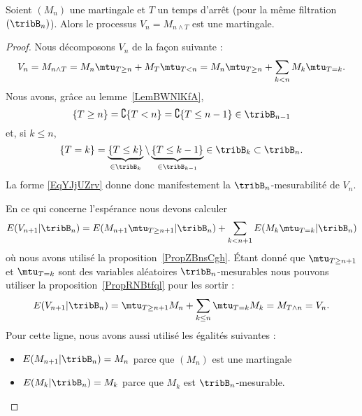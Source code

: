 \begin{proposition} \label{PropAYJpGsc}
    Soient \( (M_n)\) une martingale et \( T\) un temps d'arrêt (pour la même filtration \( (\tribB_n)\)). Alors le processus \( V_n=M_{n\wedge T}\) est une martingale.
\end{proposition}

\begin{proof}
    Nous décomposons \( V_n\) de la façon suivante :
    \begin{equation}    \label{EqYJjUZrv}
        V_n=M_{n\wedge T}=M_n\mtu_{T\geq n}+M_T\mtu_{T<n}=M_n\mtu_{T\geq n}+\sum_{k< n}M_k\mtu_{T=k}.
    \end{equation}
    Nous avons, grâce au lemme~\ref{LemBWNlKfA},
    \begin{equation}
        \{ T\geq n \}=\complement\{ T<n \}=\complement\{ T\leq n-1 \}\in\tribB_{n-1}
    \end{equation}
    et, si \( k\leq n\),
    \begin{equation}
        \{ T=k \}=\underbrace{\{ T\leq k \}}_{\in\tribB_k}\setminus\underbrace{\{ T\leq k-1 \}}_{\in\tribB_{k-1}}\in\tribB_k\subset\tribB_n.
    \end{equation}
    La forme \eqref{EqYJjUZrv} donne donc manifestement la \( \tribB_n\)-mesurabilité de \( V_n\).

    En ce qui concerne l'espérance nous devons calculer
    \begin{equation}
        E(V_{n+1}|\tribB_n)=E(M_{n+1}\mtu_{T\geq n+1}|\tribB_n)+\sum_{k<n+1}E(M_k\mtu_{T=k}|\tribB_n)
    \end{equation}
    où nous avons utilisé la proposition~\ref{PropZBnsCgh}. Étant donné que \( \mtu_{T\geq n+1}\) et \( \mtu_{T=k}\) sont des variables aléatoires \( \tribB_n\)-mesurables nous pouvons utiliser la proposition~\ref{PropRNBtfql} pour les sortir :
    \begin{equation}
        E(V_{n+1}|\tribB_n)=\mtu_{T\geq n+1}M_n+\sum_{k\leq n}\mtu_{T=k}M_k=M_{T\wedge n}=V_n.
    \end{equation}
    Pour cette ligne, nous avons aussi utilisé les égalités suivantes :
    \begin{itemize}
        \item 
     \( E(M_{n+1}|\tribB_n)=M_n\) parce que \( (M_n)\) est une martingale
 \item
      \( E(M_k|\tribB_n)=M_k\) parce que \( M_k\) est \( \tribB_n\)-mesurable.
    \end{itemize}
\end{proof}

